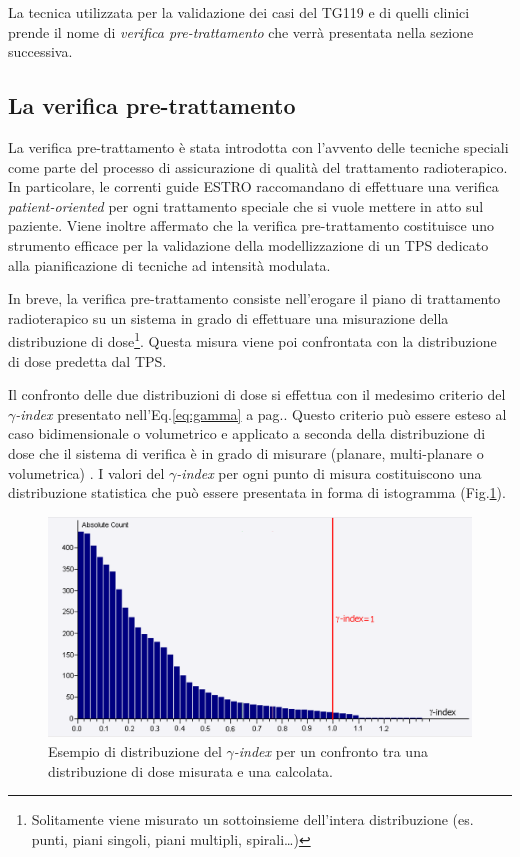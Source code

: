 La tecnica utilizzata per la validazione dei casi del TG119 e di quelli clinici prende il nome di \textit{verifica pre-trattamento} che verrà presentata nella sezione successiva.

\subsection{La verifica pre-trattamento}
La verifica pre-trattamento è stata introdotta con l'avvento delle tecniche speciali come parte del processo di assicurazione di qualità del trattamento radioterapico. In particolare, le correnti guide ESTRO \cite{Mijnheer2005} raccomandano di effettuare una verifica \textit{patient-oriented} per ogni trattamento speciale che si vuole mettere in atto sul paziente. Viene inoltre affermato che la verifica pre-trattamento costituisce uno strumento efficace per la validazione della modellizzazione di un TPS dedicato alla pianificazione di tecniche ad intensità modulata.

In breve, la verifica pre-trattamento consiste nell'erogare il piano di trattamento radioterapico su un sistema in grado di effettuare una misurazione della distribuzione di dose\footnote{Solitamente viene misurato un sottoinsieme dell'intera distribuzione (es. punti, piani singoli, piani multipli, spirali\ldots)}. Questa misura viene poi confrontata con la distribuzione di dose predetta dal TPS.

Il confronto delle due distribuzioni di dose si effettua con il medesimo criterio del $\gamma$\textit{-index} presentato nell'Eq.\ref{eq:gamma} a pag.\pageref{eq:gamma}. Questo criterio può essere esteso al caso bidimensionale o volumetrico e applicato a seconda della distribuzione di dose che il sistema di verifica è in grado di misurare (planare, multi-planare o volumetrica) \cite{Low2011}. I valori del $\gamma$\textit{-index} per ogni punto di misura costituiscono una distribuzione statistica che può essere presentata in forma di istogramma (Fig.\ref{fig:gamma_histo}).
\begin{figure}
\centering
\includegraphics[width=\textwidth]{./cap2/gamma_histo.png}
\caption{Esempio di distribuzione del $\gamma$\textit{-index} per un confronto tra una distribuzione di dose misurata e una calcolata.}
\label{fig:gamma_histo}
\end{figure}

